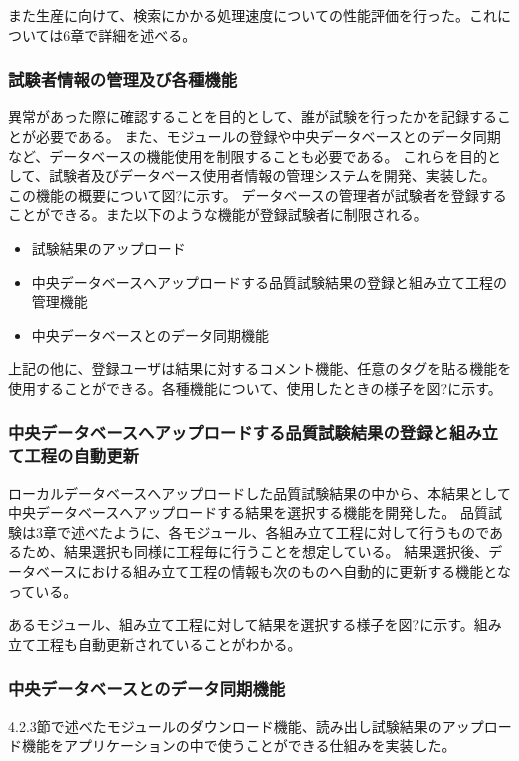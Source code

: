 また生産に向けて、検索にかかる処理速度についての性能評価を行った。これについては6章で詳細を述べる。

\subsubsection{試験者情報の管理及び各種機能}

異常があった際に確認することを目的として、誰が試験を行ったかを記録することが必要である。
また、モジュールの登録や中央データベースとのデータ同期など、データベースの機能使用を制限することも必要である。
これらを目的として、試験者及びデータベース使用者情報の管理システムを開発、実装した。
この機能の概要について図?に示す。
データベースの管理者が試験者を登録することができる。また以下のような機能が登録試験者に制限される。

\begin{itemize}
  \item 試験結果のアップロード
  \item 中央データベースへアップロードする品質試験結果の登録と組み立て工程の管理機能
  \item 中央データベースとのデータ同期機能
\end{itemize}

上記の他に、登録ユーザは結果に対するコメント機能、任意のタグを貼る機能を使用することができる。各種機能について、使用したときの様子を図?に示す。

\subsubsection{中央データベースへアップロードする品質試験結果の登録と組み立て工程の自動更新}
ローカルデータベースへアップロードした品質試験結果の中から、本結果として中央データベースへアップロードする結果を選択する機能を開発した。
品質試験は3章で述べたように、各モジュール、各組み立て工程に対して行うものであるため、結果選択も同様に工程毎に行うことを想定している。
結果選択後、データベースにおける組み立て工程の情報も次のものへ自動的に更新する機能となっている。

あるモジュール、組み立て工程に対して結果を選択する様子を図?に示す。組み立て工程も自動更新されていることがわかる。

\subsubsection{中央データベースとのデータ同期機能}
4.2.3節で述べたモジュールのダウンロード機能、読み出し試験結果のアップロード機能をアプリケーションの中で使うことができる仕組みを実装した。

